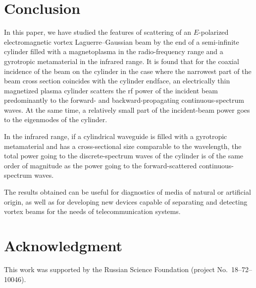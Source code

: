 \documentclass[conference,a4paper]{IEEEtran}
\begin{document}
\section{Conclusion}
In this paper, we have studied the features of scattering of an $E$-polarized electromagnetic vortex Laguerre--Gaussian beam by the end of a semi-infinite cylinder filled with a magnetoplasma in the radio-frequency range and a gyrotropic metamaterial in the infrared range. It is found that for the coaxial incidence of the beam on the cylinder in the case where the narrowest part of the beam cross section coincides with the cylinder endface, an electrically thin magnetized plasma cylinder scatters the rf power of the incident beam predominantly to the forward- and backward-propagating continuous-spectrum waves. At the same time, a relatively small part of the incident-beam power goes to the eigenmodes of the cylinder. 

In the infrared range, if a cylindrical waveguide is filled with a gyrotropic metamaterial and has a cross-sectional size comparable to the wavelength, the total power going to the discrete-spectrum waves of the cylinder is of the same order of magnitude as the power going to the forward-scattered continuous-spectrum waves.


The results obtained can be useful for diagnostics of media of natural or artificial origin, as well as for developing new devices capable of separating and detecting vortex beams for the needs of telecommunication systems.

\section*{Acknowledgment}

This work was supported by the Russian Science Foundation (project No.~18--72--10046).
\end{document}
